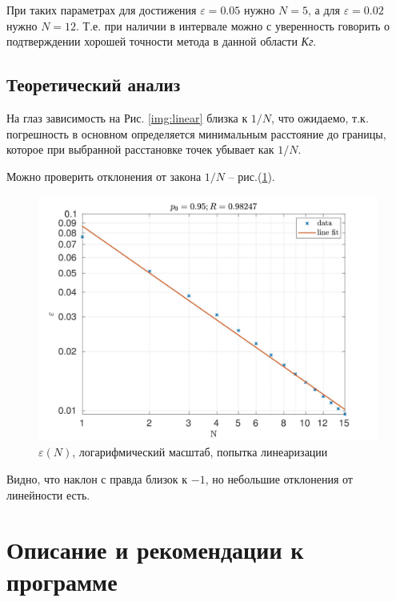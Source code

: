 \documentclass[a4paper,12pt]{article} %
\begin{document}
При таких параметрах для достижения $\varepsilon = 0.05$ нужно $N = 5$, а для $\varepsilon = 0.02$ нужно $N = 12$. Т.е. при наличии  в интервале можно с уверенность говорить о подтверждении хорошей точности метода в данной области \emph{Кг}.

\newpage

\subsection{Теоретический анализ}

На глаз зависимость на Рис. \ref{img:linear} близка к $1/N$, что ожидаемо, т.к. погрешность в основном определяется минимальным расстояние до границы, которое при выбранной расстановке точек убывает как $1/N$. 

Можно проверить отклонения от закона $1/N$ -- рис.(\ref{img:log}).

\begin{figure}[h!]
\begin{center}
\includegraphics[width=1\textwidth]{./pics/log}
\end{center}
\caption{$\varepsilon(N)$, логарифмический масштаб, попытка линеаризации} \label{img:log}
\end{figure}

Видно, что наклон с правда близок к $-1$, но небольшие отклонения от линейности есть.

\newpage

\section{Описание и рекомендации к программе}
\end{document}
